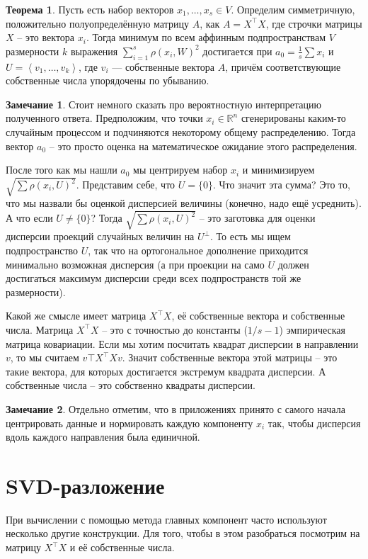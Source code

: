 \documentclass[12pt,a4paper,oneside]{book}
\theoremstyle{definition}
\newtheorem*{rem}{\color{green!50!blue}Замечание}
\newtheorem{thm}{\color{red!40!black}Теорема}
\newcommand{\R}{\mathbb R}
\def\lan{\left\langle }
\def\ran{\right\rangle}
\def\thrm{\begin{thm}}
\def\ethrm{\end{thm}}
\def\rm{\begin{rem}}
\def\erm{\end{rem}}
\begin{document}
\thrm  Пусть есть набор векторов $x_1,\dots,x_s \in V$. Определим симметричную, положительно полуопределённую матрицу $A$, как $A=X^{\top}X$, где строчки матрицы $X$ -- это вектора $x_i$. Тогда минимум по всем аффинным подпространствам $V$ размерности $k$ выражения $\sum_{i=1}^s \rho(x_i,W)^2$ достигается при $a_0=\frac{1}{s}\sum x_i$  и $U=\lan v_1,\dots,v_k\ran$, где $v_i$ --- собственные вектора $A$, причём соответствующие собственные числа упорядочены по убыванию. 
\ethrm

\rm Стоит немного сказать про вероятностную интерпретацию полученного ответа. Предположим, что точки $x_i\in \R^n$ сгенерированы каким-то случайным процессом и подчиняются некоторому общему распределению. Тогда вектор $a_0$ -- это просто оценка на математическое ожидание этого распределения.

После того как мы нашли $a_0$ мы центрируем набор $x_i$ и минимизируем $\sqrt{\sum \rho (x_i, U)^2}$. Представим себе, что $U=\{0\}$. Что значит эта сумма? Это то, что мы назвали бы оценкой дисперсией величины (конечно, надо ещё усреднить). 
А что если $U \neq \{0\}$? Тогда $\sqrt{\sum \rho (x_i, U)^2}$ -- это заготовка для оценки дисперсии проекций случайных величин на $U^\bot$. То есть мы ищем подпространство $U$, так что на ортогональное дополнение приходится минимально возможная дисперсия (а при проекции на само $U$ должен достигаться максимум дисперсии среди всех подпространств той же размерности).

Какой же смысле имеет матрица $X^\top X$, её собственные вектора и собственные числа. Матрица $X^\top X$ -- это с точностью до константы ($1/s-1$) эмпирическая матрица ковариации. Если мы хотим посчитать квадрат дисперсии в направлении $v$, то мы считаем $v\top X^\top X v$. Значит собственные вектора этой матрицы -- это такие вектора, для которых достигается экстремум квадрата дисперсии. А собственные числа -- это собственно квадраты дисперсии.
\erm

\rm Отдельно отметим, что в приложениях принято с самого начала центрировать данные и нормировать каждую компоненту $x_i$ так, чтобы дисперсия вдоль каждого направления была единичной.
\erm



\section{SVD-разложение}

При вычислении с помощью метода главных компонент часто используют несколько другие конструкции. Для того, чтобы в этом разобраться посмотрим на матрицу  $X^{\top}X$  и её собственные числа.  
\end{document}
